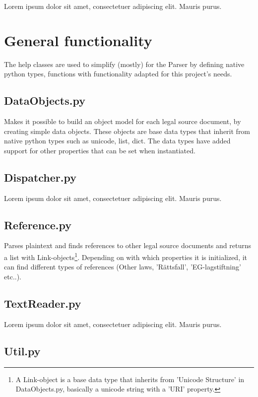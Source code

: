 \documentclass[a4paper,11pt]{kth-mag}
\begin{document}
Lorem ipsum dolor sit amet, consectetuer adipiscing elit. Mauris
purus. 

\section{General functionality}

The help classes are used to simplify (mostly) for the Parser by defining native python types, functions with functionality adapted for this project's needs.  

\subsection{DataObjects.py}

Makes it possible to build an object model for each legal source document, by
creating simple data objects. These objects are base data types that inherit
from native python types such as unicode, list, dict. The data types have
added support for other properties that can be set when instantiated.

\subsection{Dispatcher.py}

Lorem ipsum dolor sit amet, consectetuer adipiscing elit. Mauris
purus. 

\subsection{Reference.py}

Parses plaintext and finds references to other legal source documents and
returns a list with Link-objects\footnote{A Link-object is a base data type
that inherits from 'Unicode Structure' in DataObjects.py, basically a unicode
string with a 'URI' property.}. Depending on with which properties it is
initialized, it can find different types of references (Other laws,
'Rättsfall', 'EG-lagstiftning' etc..).

\subsection{TextReader.py}

Lorem ipsum dolor sit amet, consectetuer adipiscing elit. Mauris
purus. 

\subsection{Util.py}
\end{document}
